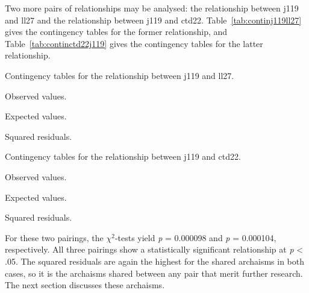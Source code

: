 Two more pairs of relationships may be analysed: the relationship between \gls{j119} and \gls{ll27} and the relationship between \gls{j119} and \gls{ctd22}. Table~\ref{tab:continj119ll27} gives the contingency tables for the former relationship, and Table~\ref{tab:continctd22j119} gives the contingency tables for the latter relationship. 
\begin{table}[h]
  \centering
  \caption{Contingency tables for the relationship between \acrshort{j119} and \acrshort{ll27}.}
  \label{tab:continj119ll27}
  \begin{subtable}[b]{0.5\linewidth}
    \centering
    \caption{Observed values.}
    \label{stab:obsj119ll27}
  \end{subtable}%
  \begin{subtable}[b]{0.5\linewidth}
    \centering
    \caption{Expected values.}
    \label{stab:expj119ll27}
  \end{subtable}
  \begin{subtable}[b]{0.5\linewidth}
    \centering
    \caption{Squared residuals.}
    \label{stab:sqresj119ll27}
  \end{subtable}
\end{table}

\begin{table}[h]
  \centering
  \caption{Contingency tables for the relationship between \acrshort{j119} and \acrshort{ctd22}.}
  \label{tab:continctd22j119}
  \begin{subtable}[b]{0.5\linewidth}
    \centering
    \caption{Observed values.}
    \label{stab:obsctd22j119}
  \end{subtable}%
  \begin{subtable}[b]{0.5\linewidth}
    \centering
    \caption{Expected values.}
    \label{stab:expctd22j119}
  \end{subtable}
  \begin{subtable}[b]{0.5\linewidth}
    \centering
    \caption{Squared residuals.}
    \label{stab:sqresctd22j119}
  \end{subtable}
\end{table}
For these two pairings, the \(\chi^2\)-tests yield \emph{p} = 0.000098 and \emph{p} = 0.000104, respectively. All three pairings show a statistically significant relationship at \textit{p} < .05. The squared residuals are again the highest for the shared archaisms in both cases, so it is the archaisms shared between any pair that merit further research. The next section  discusses these archaisms.


